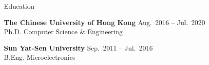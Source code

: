 

\begin{rSection}{Education}

{\bf The Chinese University of Hong Kong} \hfill { Aug.~2016 -- Jul.~2020}\\
Ph.D. \quad Computer Science \& Engineering

{\bf Sun Yat-Sen University} \hfill { Sep.~2011 -- Jul.~2016}\\
B.Eng. \quad Microelectronics
\end{rSection}

